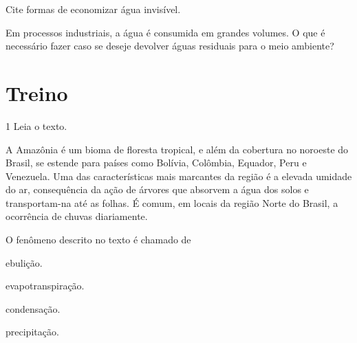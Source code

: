 \begin{escolha}
\item Cite formas de economizar água invisível.\\

\item Em processos industriais, a água é consumida em grandes
volumes. O que é necessário fazer caso se deseje devolver águas
residuais para o meio ambiente?\\
\end{escolha}

\pagebreak
\section*{Treino}

\num{1} Leia o texto.

A Amazônia é um bioma de floresta tropical, e além da
cobertura no noroeste do Brasil, se estende para países como Bolívia,
Colômbia, Equador, Peru e Venezuela. Uma das características mais
marcantes da região é a elevada umidade do ar, consequência da ação de
árvores que absorvem a água dos solos e transportam-na até as folhas. É
comum, em locais da região Norte do Brasil, a ocorrência de chuvas
diariamente.

O fenômeno descrito no texto é chamado de\bigskip

\begin{minipage}{.5\textwidth}
\begin{escolha}
\item ebulição.

\item evapotranspiração.

\item condensação.

\item precipitação.
\end{escolha}
\end{minipage}


